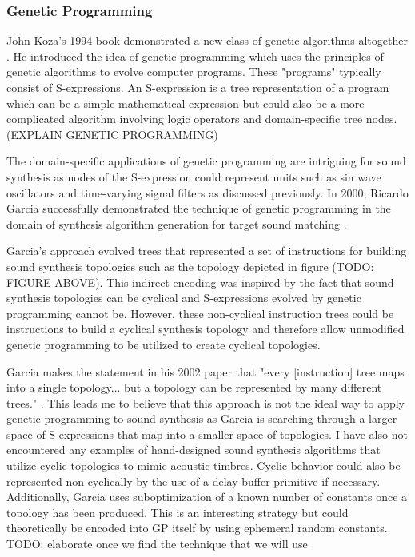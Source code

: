 \documentclass[12pt]{article}
\begin{document}
\subsubsection{Genetic Programming}
John Koza's 1994 book demonstrated a new class of genetic algorithms altogether \citep{koza1992genetic}. He introduced the idea of genetic programming which uses the principles of genetic algorithms to evolve computer programs. These "programs" typically consist of S-expressions. An S-expression is a tree representation of a program which can be a simple mathematical expression but could also be a more complicated algorithm involving logic operators and domain-specific tree nodes. (EXPLAIN GENETIC PROGRAMMING)
			
The domain-specific applications of genetic programming are intriguing for sound synthesis as nodes of the S-expression could represent units such as sin wave oscillators and time-varying signal filters as discussed previously. In 2000, Ricardo Garcia successfully demonstrated the technique of genetic programming in the domain of synthesis algorithm generation for target sound matching \citep{garcia2000towards}.

Garcia's approach evolved trees that represented a set of instructions for building sound synthesis topologies such as the topology depicted in figure (TODO: FIGURE ABOVE). This indirect encoding was inspired by the fact that sound synthesis topologies can be cyclical and S-expressions evolved by genetic programming cannot be. However, these non-cyclical instruction trees could be instructions to build a cyclical synthesis topology and therefore allow unmodified genetic programming to be utilized to create cyclical topologies.

Garcia makes the statement in his 2002 paper that "every [instruction] tree maps into a single topology... but a topology can be represented by many different trees." \citep{garcia2012automatic}. This leads me to believe that this approach is not the ideal way to apply genetic programming to sound synthesis as Garcia is searching through a larger space of S-expressions that map into a smaller space of topologies. I have also not encountered any examples of hand-designed sound synthesis algorithms that utilize cyclic topologies to mimic acoustic timbres. Cyclic behavior could also be represented non-cyclically by the use of a delay buffer primitive if necessary. Additionally, Garcia uses suboptimization of a known number of constants once a topology has been produced. This is an interesting strategy but could theoretically be encoded into GP itself by using ephemeral random constants. TODO: elaborate once we find the technique that we will use
\end{document}
